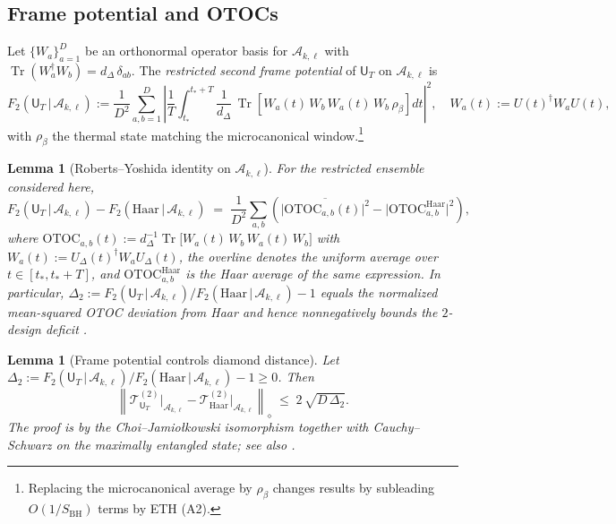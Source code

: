 \documentclass[11pt,a4paper]{article}
\newcommand{\Tr}{\operatorname{Tr}}
\theoremstyle{plain}
\newtheorem{lemma}[theorem]{Lemma}
\theoremstyle{definition}
\theoremstyle{remark}
\begin{document}
\subsection*{Frame potential and OTOCs}
Let $\{W_a\}_{a=1}^{D}$ be an orthonormal operator basis for $\mathscr{A}_{k,\ell}$ with $\Tr(W_a^\dagger W_b)=d_\Delta\,\delta_{ab}$.  The {\em restricted second frame potential} of $\mathsf{U}_T$ on $\mathscr{A}_{k,\ell}$ is
\begin{equation}
  F_2(\mathsf{U}_T \,|\, \mathscr{A}_{k,\ell}) := \frac{1}{D^2} \sum_{a,b=1}^{D}
   \left| \frac{1}{T}\int_{t_\ast}^{t_\ast+T} \frac{1}{d_\Delta}\, \Tr\!\left[ W_a(t) \, W_b \, W_a(t) \, W_b \, \rho_\beta \right] dt \right|^2,
   \quad W_a(t):=U(t)^\dagger W_a U(t),
\end{equation}
with $\rho_\beta$ the thermal state matching the microcanonical window.\footnote{Replacing the microcanonical average by $\rho_\beta$ changes results by subleading $O(1/S_{\mathrm{BH}})$ terms by ETH (A2).}

\begin{lemma}[Roberts--Yoshida identity on $\mathscr{A}_{k,\ell}$]\label{lem:RY}
For the restricted ensemble considered here,
\begin{equation}
  F_2(\mathsf{U}_T \,|\, \mathscr{A}_{k,\ell}) - F_2(\mathrm{Haar} \,|\, \mathscr{A}_{k,\ell})
  \;=\; \frac{1}{D^2}\sum_{a,b}\left( \overline{\big| \mathrm{OTOC}_{a,b}(t) \big|^2} - \big| \mathrm{OTOC}^{\mathrm{Haar}}_{a,b} \big|^2 \right),
\end{equation}
where $\mathrm{OTOC}_{a,b}(t):= d_\Delta^{-1}\Tr\!\big[ W_a(t)\,W_b\,W_a(t)\,W_b \big]$ with $W_a(t):=U_\Delta(t)^\dagger W_a U_\Delta(t)$,
the overline denotes the uniform average over $t\in[t_\ast,t_\ast+T]$, and $\mathrm{OTOC}^{\mathrm{Haar}}_{a,b}$ is the Haar average of the same expression.
In particular, $\Delta_2:=F_2(\mathsf{U}_T \,|\, \mathscr{A}_{k,\ell})/F_2(\mathrm{Haar} \,|\, \mathscr{A}_{k,\ell})-1$ equals the normalized mean-squared OTOC deviation from Haar and hence nonnegatively bounds the $2$-design deficit \cite{RobertsYoshida:2017}.
\end{lemma}

\begin{lemma}[Frame potential controls diamond distance]\label{lem:FP-diamond}
Let $\Delta_2:=F_2(\mathsf{U}_T \,|\, \mathscr{A}_{k,\ell})/F_2(\mathrm{Haar} \,|\, \mathscr{A}_{k,\ell})-1\ge 0$.  
Then
\begin{equation}
 \left\| \mathcal{T}^{(2)}_{\mathsf{U}_T}\big|_{\mathscr{A}_{k,\ell}} - \mathcal{T}^{(2)}_{\mathrm{Haar}}\big|_{\mathscr{A}_{k,\ell}} \right\|_{\diamond}
 \;\le\; 2\, \sqrt{ D \, \Delta_2 }.
\end{equation}
The proof is by the Choi--Jamio\l{}kowski isomorphism together with Cauchy--Schwarz on the maximally entangled state; see also \cite{RobertsYoshida:2017,Brandao:2016}.
\end{lemma}
\end{document}
